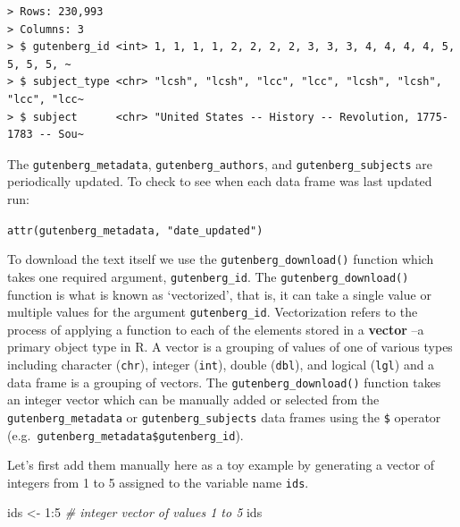 \documentclass[
  letterpaper,
]{latex/krantz}
\newenvironment{Shaded}{\begin{snugshade}}{\end{snugshade}}
\newcommand{\CommentTok}[1]{\textcolor[rgb]{0.00,0.00,0.00}{\textit{#1}}}
\newcommand{\DecValTok}[1]{\textcolor[rgb]{0.00,0.00,0.00}{#1}}
\newcommand{\NormalTok}[1]{\textcolor[rgb]{0.00,0.00,0.00}{#1}}
\newcommand{\OtherTok}[1]{\textcolor[rgb]{0.00,0.00,0.00}{#1}}
\newcommand{\SpecialCharTok}[1]{\textcolor[rgb]{0.00,0.00,0.00}{#1}}
\begin{document}
\begin{verbatim}
> Rows: 230,993
> Columns: 3
> $ gutenberg_id <int> 1, 1, 1, 1, 2, 2, 2, 2, 3, 3, 3, 4, 4, 4, 4, 5, 5, 5, 5, ~
> $ subject_type <chr> "lcsh", "lcsh", "lcc", "lcc", "lcsh", "lcsh", "lcc", "lcc~
> $ subject      <chr> "United States -- History -- Revolution, 1775-1783 -- Sou~
\end{verbatim}

\begin{tcolorbox}[enhanced jigsaw, colbacktitle=quarto-callout-warning-color!10!white, arc=.35mm, toprule=.15mm, breakable, colframe=quarto-callout-warning-color-frame, bottomrule=.15mm, opacitybacktitle=0.6, coltitle=black, titlerule=0mm, colback=white, toptitle=1mm, bottomtitle=1mm, title=\textcolor{quarto-callout-warning-color}{\faExclamationTriangle}\hspace{0.5em}{Tip}, rightrule=.15mm, leftrule=.75mm, opacityback=0, left=2mm]

The \texttt{gutenberg\_metadata}, \texttt{gutenberg\_authors}, and
\texttt{gutenberg\_subjects} are periodically updated. To check to see
when each data frame was last updated run:

\texttt{attr(gutenberg\_metadata,\ "date\_updated")}

\end{tcolorbox}

To download the text itself we use the \texttt{gutenberg\_download()}
function which takes one required argument, \texttt{gutenberg\_id}. The
\texttt{gutenberg\_download()} function is what is known as
`vectorized', that is, it can take a single value or multiple values for
the argument \texttt{gutenberg\_id}. Vectorization refers to the process
of applying a function to each of the elements stored in a
\textbf{vector} --a primary object type in R. A vector is a grouping of
values of one of various types including character (\texttt{chr}),
integer (\texttt{int}), double (\texttt{dbl}), and logical
(\texttt{lgl}) and a data frame is a grouping of vectors. The
\texttt{gutenberg\_download()} function takes an integer vector which
can be manually added or selected from the \texttt{gutenberg\_metadata}
or \texttt{gutenberg\_subjects} data frames using the \texttt{\$}
operator (e.g.~\texttt{gutenberg\_metadata\$gutenberg\_id}).

Let's first add them manually here as a toy example by generating a
vector of integers from 1 to 5 assigned to the variable name
\texttt{ids}.

\begin{Shaded}
\begin{Highlighting}[]
\NormalTok{ids }\OtherTok{\textless{}{-}} \DecValTok{1}\SpecialCharTok{:}\DecValTok{5} \CommentTok{\# integer vector of values 1 to 5}
\NormalTok{ids}
\end{Highlighting}
\end{Shaded}
\end{document}
